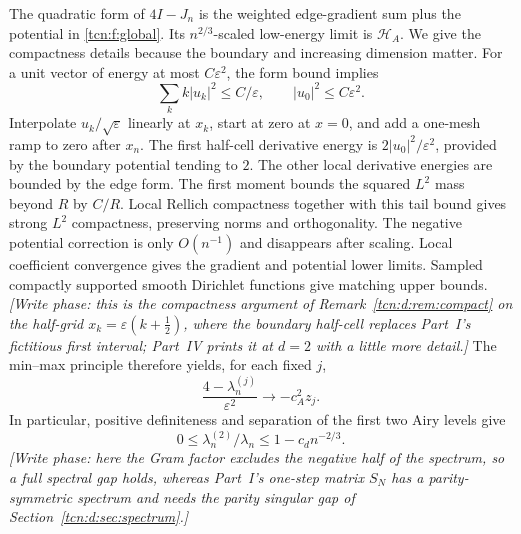 \documentclass[11pt,letterpaper]{article}
\newcommand{\eps}{\varepsilon}
\theoremstyle{remark}
\begin{document}
The quadratic form of $4I-J_n$ is the weighted edge-gradient sum plus the potential in \eqref{tcn:f:global}. Its $n^{2/3}$-scaled low-energy limit is $\mathcal H_A$. We give the compactness details because the boundary and increasing dimension matter. For a unit vector of energy at most $C\eps^2$, the form bound implies
\[
 \sum_k k|u_k|^2\le C/\eps,\qquad |u_0|^2\le C\eps^2.
\]
Interpolate $u_k/\sqrt\eps$ linearly at $x_k$, start at zero at $x=0$, and add a one-mesh ramp to zero after $x_n$. The first half-cell derivative energy is $2|u_0|^2/\eps^2$, provided by the boundary potential tending to $2$. The other local derivative energies are bounded by the edge form. The first moment bounds the squared $L^2$ mass beyond $R$ by $C/R$. Local Rellich compactness together with this tail bound gives strong $L^2$ compactness, preserving norms and orthogonality. The negative potential correction is only $O(n^{-1})$ and disappears after scaling. Local coefficient convergence gives the gradient and potential lower limits. Sampled compactly supported smooth Dirichlet functions give matching upper bounds. \emph{[Write phase: this is the compactness argument of Remark~\ref{tcn:d:rem:compact} on the half-grid $x_k=\eps(k+\frac12)$, where the boundary half-cell replaces Part~I's fictitious first interval; Part~IV prints it at $d=2$ with a little more detail.]} The min--max principle therefore yields, for each fixed $j$,
\begin{equation}\label{tcn:f:spectrallimit}
 \frac{4-\lambda_n^{(j)}}{\eps^2}\longrightarrow-c_A^2z_j.
\end{equation}
In particular, positive definiteness and separation of the first two Airy levels give
\begin{equation}\label{tcn:f:gap}
 0\le\lambda_n^{(2)}/\lambda_n\le1-c_d n^{-2/3}.
\end{equation}
\emph{[Write phase: here the Gram factor excludes the negative half of the spectrum, so a full spectral gap holds, whereas Part~I's one-step matrix $S_N$ has a parity-symmetric spectrum and needs the parity singular gap of Section~\ref{tcn:d:sec:spectrum}.]}
\end{document}
